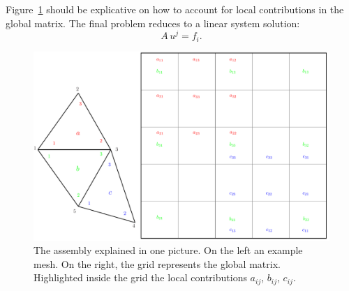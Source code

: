 \documentclass[11pt]{amsart}
\begin{document}
Figure~\ref{fig:assembly} should be explicative on how to account for local 
contributions in the global matrix. The final problem reduces to a linear system solution:
\[
A\, u^j = f_i.
\]
\begin{figure}[h]
\centering
\includegraphics[scale=.8]{assembly-pics.pdf}
\caption{The assembly explained in one picture. On the left an example 
mesh. On the right, the grid represents the global matrix. Highlighted inside the 
grid the local contributions $a_{ij}$, $b_{ij}$, $c_{ij}$.}
\label{fig:assembly}
\end{figure}
\end{document}
